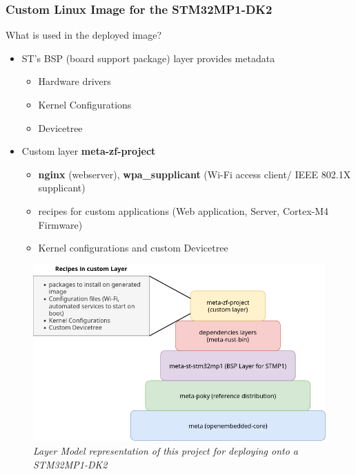 \documentclass[8pt,compress,aspectratio=169]{beamer}
\newcommand\DarkBold[1]{\textcolor{VSBlueDark}{\textbf{#1}}}
\newcommand\DarkBoldP[1]{\textcolor{VSPurpleDark}{\textbf{#1}}}
\begin{document}
\begin{frame}
  \frametitle{Custom Linux Image for the STM32MP1-DK2}
  \begin{minipage}{0.475\textwidth}
    \begin{block}{What is used in the deployed image?}
      \begin{itemize}
        \item ST's BSP (board support package) layer provides metadata 
          \begin{itemize}
            \small
            \item Hardware drivers
            \item Kernel Configurations
            \item Devicetree
          \end{itemize}
        \item Custom layer \DarkBoldP{meta-zf-project}
          \begin{itemize}
            \small
            \item \DarkBold{nginx} (webserver), \DarkBold{wpa\_supplicant} (Wi-Fi access client/
              IEEE 802.1X supplicant)
            \item recipes for custom applications (Web application, Server, Cortex-M4 Firmware)
            \item Kernel configurations and custom Devicetree
          \end{itemize}
      \end{itemize}
    \end{block}
  \end{minipage}
  \hfill
  \begin{minipage}{0.5\textwidth}
    \begin{figure}
      \includegraphics[width=1.125\textwidth]{assets/diagrams/layers.png}
      \caption{\it Layer Model representation of this project for deploying onto a 
      STM32MP1-DK2}
    \end{figure}
  \end{minipage}
\end{frame}
\end{document}
